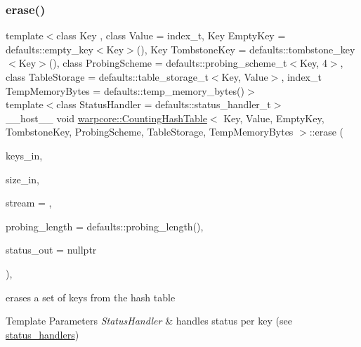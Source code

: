 \subsubsection{\texorpdfstring{erase()}{erase()}\hspace{0.1cm}{\footnotesize\ttfamily [2/2]}}
{\footnotesize\ttfamily template$<$class Key , class Value  = index\+\_\+t, Key Empty\+Key = defaults\+::empty\+\_\+key$<$\+Key$>$(), Key Tombstone\+Key = defaults\+::tombstone\+\_\+key$<$\+Key$>$(), class Probing\+Scheme  = defaults\+::probing\+\_\+scheme\+\_\+t$<$\+Key, 4$>$, class Table\+Storage  = defaults\+::table\+\_\+storage\+\_\+t$<$\+Key, Value$>$, index\+\_\+t Temp\+Memory\+Bytes = defaults\+::temp\+\_\+memory\+\_\+bytes()$>$ \\
template$<$class Status\+Handler  = defaults\+::status\+\_\+handler\+\_\+t$>$ \\
\+\_\+\+\_\+host\+\_\+\+\_\+ void \hyperlink{classwarpcore_1_1CountingHashTable}{warpcore\+::\+Counting\+Hash\+Table}$<$ Key, Value, Empty\+Key, Tombstone\+Key, Probing\+Scheme, Table\+Storage, Temp\+Memory\+Bytes $>$\+::erase (\begin{DoxyParamCaption}\item[{key\+\_\+type $\ast$}]{keys\+\_\+in,  }\item[{index\+\_\+type}]{size\+\_\+in,  }\item[{cuda\+Stream\+\_\+t}]{stream = {},  }\item[{index\+\_\+type}]{probing\+\_\+length = {\ttfamily defaults\+:\+:probing\+\_\+length()},  }\item[{typename Status\+Handler\+::base\+\_\+type $\ast$}]{status\+\_\+out = {\ttfamily nullptr} }\end{DoxyParamCaption})\hspace{0.3cm}{\ttfamily [inline]}, {\ttfamily [noexcept]}}



erases a set of keys from the hash table 


\begin{DoxyTemplParams}{Template Parameters}
{\em Status\+Handler} & handles status per key (see {\ttfamily \hyperlink{namespacewarpcore_1_1status__handlers}{status\+\_\+handlers}}) \\
\hline
\end{DoxyTemplParams}

